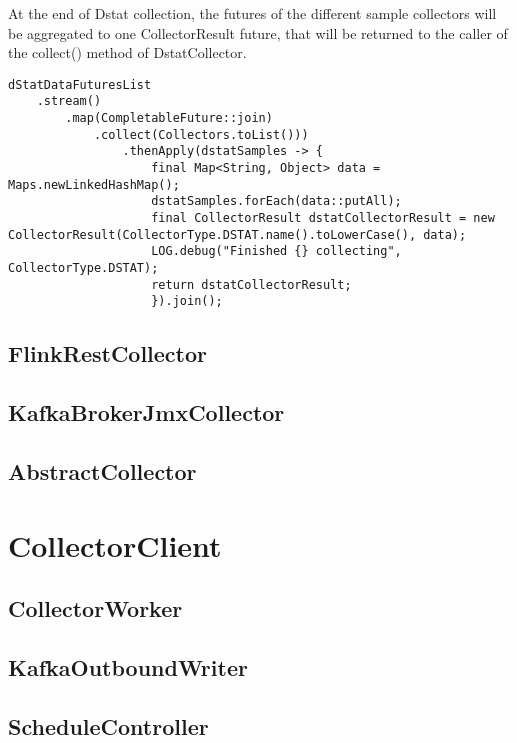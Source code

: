 At the end of Dstat collection, the futures of the different sample collectors will be aggregated
to one CollectorResult future, that will be returned to the caller of the collect() method of DstatCollector.
\begin{lstlisting}[caption={Aggregation of sample results in "DstatCollector"}, captionpos=b, label={lst:dstatsampleaggregation}]
dStatDataFuturesList
    .stream()
        .map(CompletableFuture::join)
            .collect(Collectors.toList()))
                .thenApply(dstatSamples -> {
                    final Map<String, Object> data = Maps.newLinkedHashMap();
                    dstatSamples.forEach(data::putAll);
                    final CollectorResult dstatCollectorResult = new CollectorResult(CollectorType.DSTAT.name().toLowerCase(), data);
                    LOG.debug("Finished {} collecting", CollectorType.DSTAT);
                    return dstatCollectorResult;
                    }).join();
\end{lstlisting}

\subsection{FlinkRestCollector}

\subsection{KafkaBrokerJmxCollector}

\subsection{AbstractCollector}

\section{CollectorClient}

\subsection{CollectorWorker}

\subsection{KafkaOutboundWriter}

\subsection{ScheduleController}

